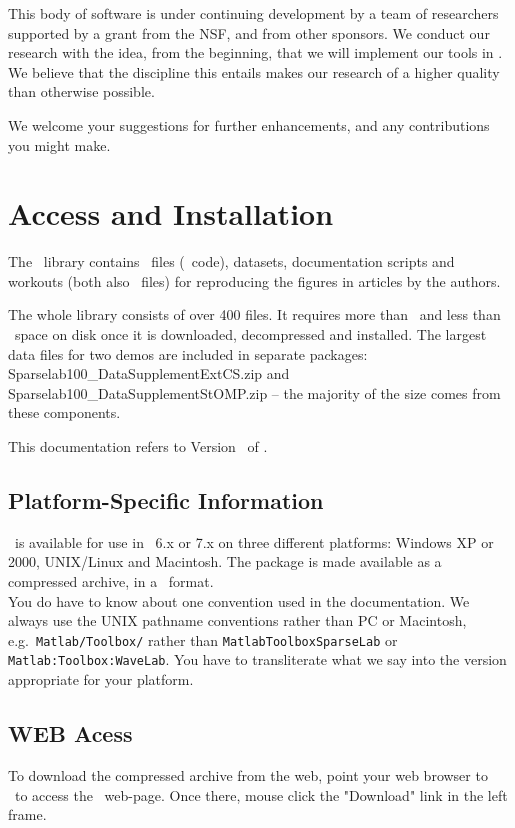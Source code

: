 \documentclass{article}
\begin{document}
This body of software is under continuing development by a team of researchers supported by a grant
from the NSF, and from other sponsors. We conduct our research with the idea, from the beginning,
that we will implement our tools in \WaveLab. We believe that the discipline this entails makes our
research of a higher quality than otherwise possible.

We welcome your suggestions for further enhancements, and any contributions you might make.

\pagebreak

\section{Access and Installation}

The \WaveLab\ library contains \dotm\ files (\Matlab\ code), datasets, documentation scripts and
workouts (both also \dotm\ files) for reproducing the figures in articles by the authors.

The whole library consists of over 400 files. It requires more than \MinSize\ and less than
\MaxSize\ space on disk once it is downloaded, decompressed and installed. The largest data files
for two demos are included in separate packages: Sparselab100\_DataSupplementExtCS.zip and
Sparselab100\_DataSupplementStOMP.zip -- the majority of the size comes from these components.

This documentation refers to Version \WLVersion\ of \WaveLab.

\subsection{Platform-Specific Information}

\WaveLab\ is available for use in \Matlab\ 6.x or 7.x on three
different platforms: Windows XP or 2000, UNIX/Linux and Macintosh.
The package is made available as a compressed archive, in a \dotzip\
format.\\
 You do have to know about one convention used in the
documentation. We always use the UNIX pathname conventions rather
than PC or Macintosh, e.g.\ {\tt Matlab/Toolbox/\WLDir} rather than
{\tt Matlab\BS Toolbox\BS SparseLab} or {\tt
Matlab:Toolbox:WaveLab}. You have to transliterate what we say into
the version appropriate for your platform.

\subsection {WEB Acess}
To download the compressed archive from the web, point your web
browser to \WLWEB\ to access the \WaveLab\ web-page. Once there,
mouse click the "Download" link in the left frame.
\end{document}
